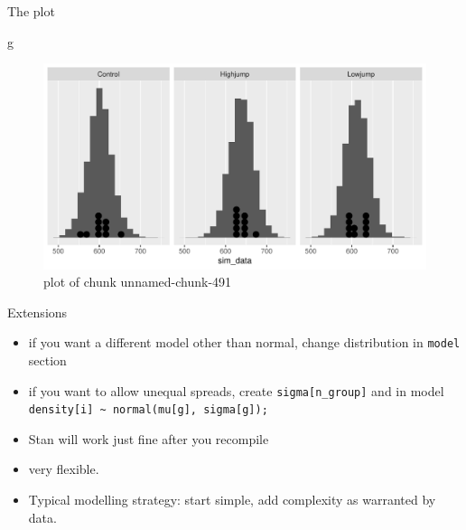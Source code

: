 \documentclass[
  ignorenonframetext,
]{beamer}
\newenvironment{Shaded}{\begin{snugshade}}{\end{snugshade}}
\newcommand{\NormalTok}[1]{#1}
\providecommand{\tightlist}{%
  \setlength{\itemsep}{0pt}\setlength{\parskip}{0pt}}
\begin{document}
\begin{frame}[fragile]{The plot}
\protect\hypertarget{the-plot-9}{}

\begin{Shaded}
\begin{Highlighting}[]
\NormalTok{g}
\end{Highlighting}
\end{Shaded}

\begin{figure}
\centering
\includegraphics{figure/unnamed-chunk-491-1.pdf}
\caption{plot of chunk unnamed-chunk-491}
\end{figure}

\end{frame}

\begin{frame}[fragile]{Extensions}
\protect\hypertarget{extensions}{}

\begin{itemize}
\tightlist
\item
  if you want a different model other than normal, change distribution
  in \texttt{model} section
\item
  if you want to allow unequal spreads, create
  \texttt{sigma{[}n\_group{]}} and in model
  \texttt{density{[}i{]}\ \textasciitilde{}\ normal(mu{[}g{]},\ sigma{[}g{]});}
\item
  Stan will work just fine after you recompile
\item
  very flexible.
\item
  Typical modelling strategy: start simple, add complexity as warranted
  by data.
\end{itemize}

\end{frame}
\end{document}
